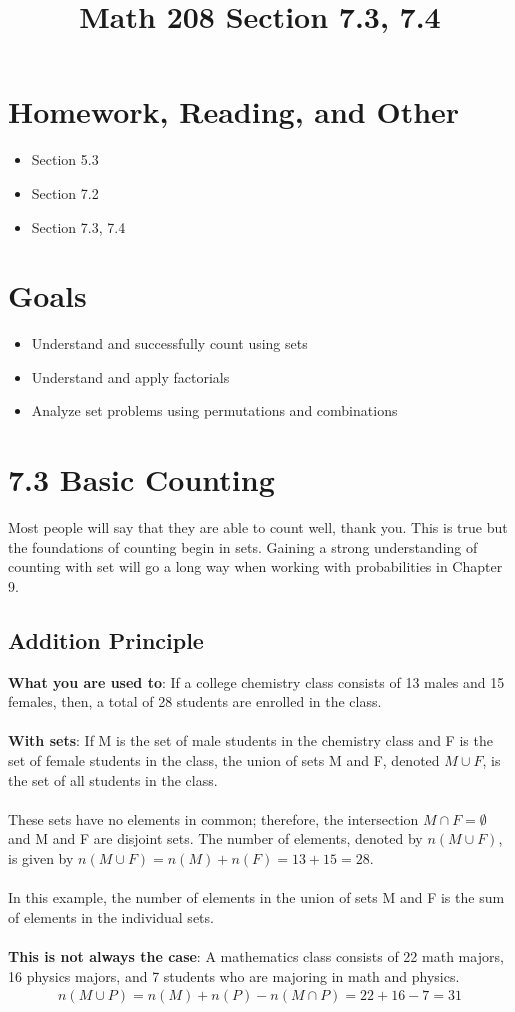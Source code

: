 \documentclass[14pt]{extarticle}
\title{\vspace{-5ex}Math 208 Section 7.3, 7.4}
\date{\vspace{-10ex}}
\begin{document}
\maketitle		
\section*{Homework, Reading, and Other}
\begin{itemize}
	\item Section 5.3
	\item Section 7.2
	\item Section 7.3, 7.4
\end{itemize}

\section*{Goals}
\begin{itemize}
	\item Understand and successfully count using sets
	\item Understand and apply factorials
	\item Analyze set problems using permutations and combinations
\end{itemize}

\section*{7.3 Basic Counting}
Most people will say that they are able to count well, thank you. This is true but the foundations of counting begin in sets. Gaining a strong understanding of counting with set will go a long way when working with probabilities in Chapter 9.

\subsection{Addition Principle}
\textbf{What you are used to}: If a college chemistry class consists of 13 males and 15 females, then, a total of 28 students are enrolled in the class.
\\\\
\textbf{With sets}: If M is the set of male students in the chemistry class and F is the set of female students in the class, the union of sets M and F, denoted $M\cup F$, is the set of all students in the class.
\\\\
These sets have no elements in common; therefore, the intersection $M\cap F = \emptyset$ and M and F are disjoint sets. The number of elements, denoted by $n(M\cup F)$, is given by 
$n(M\cup F) = n(M) + n(F) = 13 + 15 = 28$.
\\\\
In this example, the number of elements in the union of sets M and F is the sum of elements in the individual sets.
\\\\
\textbf{This is not always the case}: A mathematics class consists of 22 math majors, 16 physics majors, and 7 students who are majoring in math and physics.
\begin{align*}
	n(M\cup P) = n(M)+n(P) - n(M\cap P) = 22+16-7 = 31
\end{align*}
\end{document}

